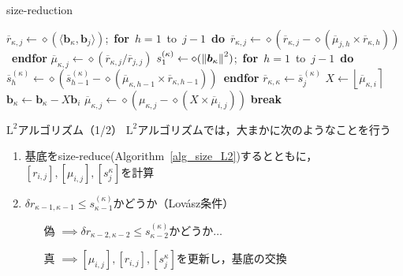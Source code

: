 \documentclass[12pt,aspectratio=169,table,dvipdfmx, leqno]{beamer}
\newcommand{\round}[1]{\left\lfloor #1 \right\rceil}
\begin{document}
\begin{frame}{}
\begin{algorithm}[H]
    \footnotesize
    \begin{algorithmic}[1]
        \caption{\footnotesize size-reduction\cite{Stehle10}}
        \label{alg_size_L2}
            \Loop
                    \State $\overline{r}_{\kappa, j}\gets \diamond(\langle\bm{b}_\kappa, \bm{b}_j\rangle)$;~\textbf{for}~$h=1$~to~$j-1$~\textbf{do}~$\overline{r}_{\kappa, j}\gets \diamond(\overline{r}_{\kappa, j}-\diamond(\overline{\mu}_{j, h}\times\overline{r}_{\kappa, h}))$~\textbf{endfor}
                    \State $\overline{\mu}_{\kappa, j}\gets \diamond(\overline{r}_{\kappa, j} / \overline{r}_{j, j})$
                    \State $s_1^{(\kappa)}\gets \diamond(\norm{\bm{b}_\kappa}^2)$;~\textbf{for}~$h=1$~to~$j-1$~\textbf{do}~$\overline{s}_h^{(\kappa)}\gets \diamond(\overline{s}_{h-1}^{(\kappa)}-\diamond(\overline{\mu}_{\kappa, h-1}\times \overline{r}_{\kappa, h-1}))$~\textbf{endfor}
                    \State $\overline{r}_{\kappa, \kappa}\gets \overline{s}_j^{(\kappa)}$
                \EndFor
                        \State $X\gets \round{\overline{\mu}_{\kappa, i}}$
                        \State $\bm{b}_\kappa\gets\bm{b}_\kappa-X\bm{b}_i$
                            \State $\overline{\mu}_{\kappa, j}\gets\diamond(\mu_{\kappa, j}-\diamond(X\times \overline{\mu}_{i, j}))$
                        \EndFor
                    \EndFor
                \Else
                    \State \textbf{break}
                \EndIf
            \EndLoop
    \end{algorithmic}
\end{algorithm}
\end{frame}

\begin{frame}{$\text{L}^2$アルゴリズム（1/2）}
$\text{L}^2$アルゴリズムでは，大まかに次のようなことを行う
\begin{enumerate}
    \item 基底をsize-reduce(Algorithm~\ref{alg_size_L2})するとともに，$[r_{i, j}], [\mu_{i, j}], [s_j^{\kappa}]$を計算
    \item $\delta r_{\kappa-1, \kappa-1}\le s_{\kappa-1}^{(\kappa)}$かどうか（Lov\'asz条件）
    \begin{itemize}
        \item[偽] $\implies$$\delta r_{\kappa-2, \kappa-2}\le s_{\kappa-2}^{(\kappa)}$かどうか$\ldots$
        \item[真] $\implies$$[\mu_{i, j}], [r_{i, j}], [s_j^{\kappa}]$を更新し，基底の交換 
    \end{itemize}
\end{enumerate}
\end{frame}
\end{document}
